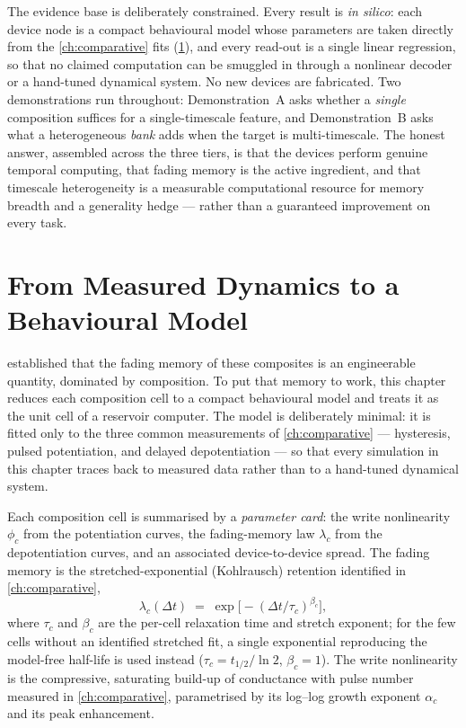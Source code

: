 \documentclass[12pt, twoside]{report}
\begin{document}
The evidence base is deliberately constrained. Every result is \emph{in silico}: each device node is a compact behavioural model whose parameters are taken directly from the \cref{ch:comparative} fits (\cref{sec:ch4_model}), and every read-out is a single linear regression, so that no claimed computation can be smuggled in through a nonlinear decoder or a hand-tuned dynamical system. No new devices are fabricated. Two demonstrations run throughout: Demonstration~A asks whether a \emph{single} composition suffices for a single-timescale feature, and Demonstration~B asks what a heterogeneous \emph{bank} adds when the target is multi-timescale. The honest answer, assembled across the three tiers, is that the devices perform genuine temporal computing, that fading memory is the active ingredient, and that timescale heterogeneity is a measurable computational resource for memory breadth and a generality hedge --- rather than a guaranteed improvement on every task.

\section[A Measured Behavioural Model]{From Measured Dynamics to a Behavioural Model}\label{sec:ch4_model}

 established that the fading memory of these composites is an engineerable quantity, dominated by composition. To put that memory to work, this chapter reduces each composition cell to a compact behavioural model and treats it as the unit cell of a reservoir computer. The model is deliberately minimal: it is fitted only to the three common measurements of \cref{ch:comparative} --- hysteresis, pulsed potentiation, and delayed depotentiation --- so that every simulation in this chapter traces back to measured data rather than to a hand-tuned dynamical system.

Each composition cell is summarised by a \emph{parameter card}: the write nonlinearity $\phi_c$ from the potentiation curves, the fading-memory law $\lambda_c$ from the depotentiation curves, and an associated device-to-device spread. The fading memory is the stretched-exponential (Kohlrausch) retention identified in \cref{ch:comparative},
\[
  \lambda_c(\Delta t) \;=\; \exp\!\big[-(\Delta t/\tau_c)^{\beta_c}\big],
\]
where $\tau_c$ and $\beta_c$ are the per-cell relaxation time and stretch exponent; for the few cells without an identified stretched fit, a single exponential reproducing the model-free half-life is used instead ($\tau_c = t_{1/2}/\ln 2$, $\beta_c = 1$). The write nonlinearity is the compressive, saturating build-up of conductance with pulse number measured in \cref{ch:comparative}, parametrised by its log--log growth exponent $\alpha_c$ and its peak enhancement.
\end{document}
